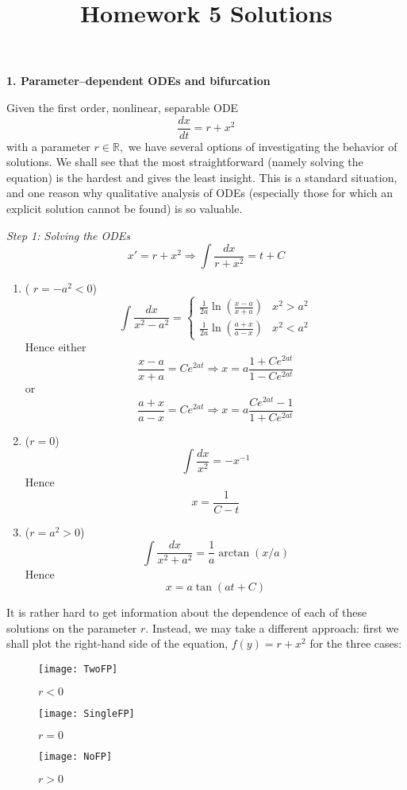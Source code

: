 \documentclass[10pt,a4paper]{article}
\title{Homework 5 Solutions}
\date{}
\begin{document}
\maketitle

\noindent \textbf{1. Parameter--dependent ODEs and bifurcation}

Given the first order, nonlinear, separable ODE
\[ \frac{dx}{dt} = r + x^2 \]
with a parameter $r \in \mathbb{R},$ we have several options of investigating the behavior of solutions. We shall see that the most straightforward (namely solving the equation) is the hardest and gives the least insight. This is a standard situation, and one reason why qualitative analysis of ODEs (especially those for which an explicit solution cannot be found) is so valuable. 

\noindent \emph{Step 1: Solving the ODEs}
\[ x' = r + x^2 \Rightarrow \int \frac{dx}{r+x^2} = t + C \]
\begin{enumerate}
\item ( $r = -a^2 <0$)
\begin{equation} \int \frac{dx}{x^2 - a^2} = 
\begin{cases} 
\frac{1}{2a} \ln(\frac{x-a}{x+a}) & x^2 > a^2 \\
\frac{1}{2a} \ln(\frac{a+x}{a-x}) & x^2 < a^2
\end{cases}
\end{equation}
Hence either  
\[ \frac{x-a}{x+a} = Ce^{2at} \Rightarrow x = a \frac{1+Ce^{2at}}{1-Ce^{2at}} \]
or 
\[ \frac{a+x}{a-x} = Ce^{2at} \Rightarrow x = a \frac{Ce^{2at}-1}{1+Ce^{2at}} \]
\item ($ r = 0$)
\begin{equation}
\int \frac{dx}{x^2} = -x^{-1} 
\end{equation}
Hence 
\[ x = \frac{1}{C - t} \]
\item ($r = a^2 > 0$)
\begin{equation}
\int \frac{dx}{x^2 + a^2} = \frac{1}{a} \arctan(x/a) 
\end{equation}
Hence
\[ x = a \tan(at + C) \]
\end{enumerate}
It is rather hard to get information about the dependence of each of these solutions on the parameter $r.$ Instead, we may take a different approach: first we shall plot the right-hand side of the equation, $f(y) = r+x^2$ for the three cases:
\begin{figure}
\centering
\texttt{[image: TwoFP]}
\caption{$r<0$}
\end{figure}
\begin{figure}
\centering
\texttt{[image: SingleFP]}
\caption{$r = 0$}
\end{figure}
\begin{figure}
\centering
\texttt{[image: NoFP]}
\caption{$r > 0$}
\end{figure}
\end{document}
